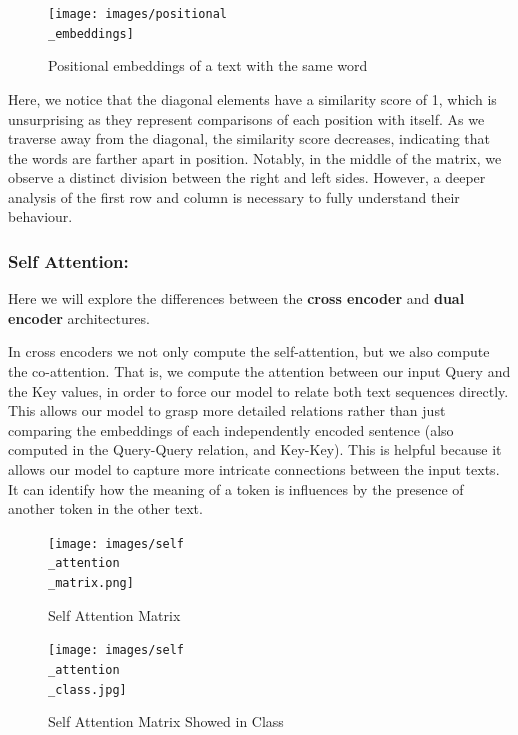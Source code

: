 \documentclass[runningheads]{llncs}
\begin{document}
\begin{figure}[!htbp]
    \center
    \texttt{[image: images/positional\\\_embeddings]}
    \caption{Positional embeddings of a text with the same word}
\end{figure}

Here, we notice that the diagonal elements have a similarity score of 1, which is unsurprising as they represent comparisons of each position with itself. As we traverse away from the diagonal, the similarity score decreases, indicating that the words are farther apart in position. Notably, in the middle of the matrix, we observe a distinct division between the right and left sides. However, a deeper analysis of the first row and column is necessary to fully understand their behaviour.\subsubsection{Self Attention:} 
Here we will explore the differences between the \textbf{cross encoder} and \textbf{dual encoder} architectures.

In cross encoders we not only compute the self-attention, but we also compute the co-attention.
That is, we compute the attention between our input Query and the Key values, in order to force our model to relate both text sequences directly. This allows our model to grasp more detailed relations rather than just comparing the embeddings of each independently encoded sentence (also computed in the Query-Query relation, and Key-Key).
This is helpful because it allows our model to capture more intricate connections between the input texts. It can identify how the meaning of a token is influences by the presence of another token in the other text.

\begin{figure}[htbp]
    \centering
    \begin{minipage}{0.50\textwidth}
        \centering
        \texttt{[image: images/self\\\_attention\\\_matrix.png]}
        \caption{Self Attention Matrix}
        \label{selfAttention}
    \end{minipage}\hfill
    \begin{minipage}{0.4\textwidth}
        \centering
        \texttt{[image: images/self\\\_attention\\\_class.jpg]}
        \caption{Self Attention Matrix Showed in Class}
         \label{selfAttentionClass}
    \end{minipage}
\end{figure}
\end{document}
